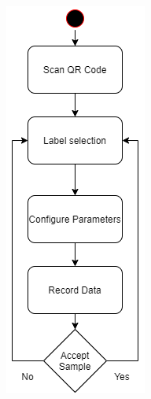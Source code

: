 \begin{figure}[h!]
    \begin{minipage}{0.5\textwidth}
        \centering
        \includegraphics[width=.8\textwidth]{charts/flow2.png}

\end{minipage}
\end{figure}
